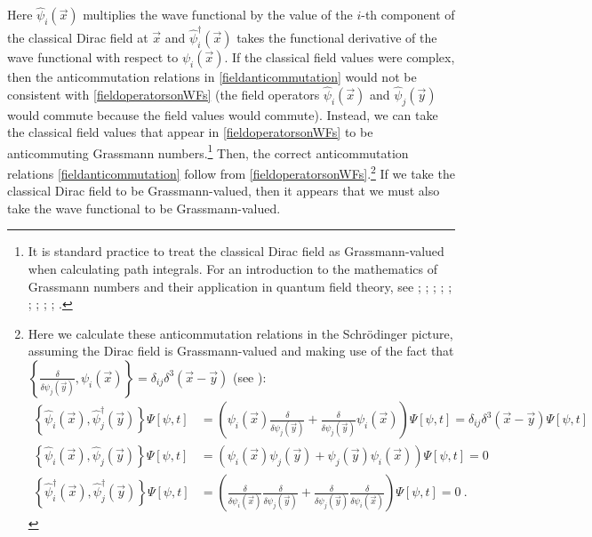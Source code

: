 \documentclass[onecolumn,secnumarabic,amsmath,amssymb,balancelastpage,nofootinbib]{article}
\begin{document}
Here $\widehat{\psi}_i(\vec{x})$ multiplies the wave functional by the value of the $i$-th component of the classical Dirac field at $\vec{x}$ and $\widehat{\psi}_i^{\dagger}(\vec{x})$ takes the functional derivative of the wave functional with respect to $\psi_i(\vec{x})$.  If the classical field values were complex, then the anticommutation relations in \eqref{fieldanticommutation} would not be consistent with \eqref{fieldoperatorsonWFs} (the field operators $\widehat{\psi}_i(\vec{x})$ and $\widehat{\psi}_j(\vec{y})$ would commute because the field values would commute).  Instead, we can take the classical field values that appear in \eqref{fieldoperatorsonWFs} to be anticommuting Grassmann numbers.\footnote{It is standard practice to treat the classical Dirac field as Grassmann-valued when calculating path integrals.  For an introduction to the mathematics of Grassmann numbers and their application in quantum field theory, see \citet{berezin}; \citet{hatfield}; \citet[ch.\ 4]{valentini1992}; \citet{valentini1996}; \citet[sec.\ 9.5]{peskinschroeder}; \citet[sec.\ 6.7]{ryder}; \citet[sec.\ 12.8]{greiner1996}; \citet[sec.\ 11.5]{zee2010}; \citet[sec.\ 10.3.2]{duncan}; \citet[sec.\ 14.6]{schwartz}.}  Then, the correct anticommutation relations \eqref{fieldanticommutation} follow from \eqref{fieldoperatorsonWFs}.\footnote{Here we calculate these anticommutation relations in the Schr\"{o}dinger picture, assuming the Dirac field is Grassmann-valued and making use of the fact that $\left\{\frac{\delta}{\delta \psi_j(\vec{y})},\psi_i(\vec{x})\right\}=\delta_{ij}\delta^3 (\vec{x}-\vec{y})$ (see \citealp[eq.\ 9.63]{hatfield}):
\begin{align}
\left\{\widehat{\psi}_i(\vec{x}),\widehat{\psi}^{\dagger}_j(\vec{y})\right\}\Psi[\psi,t]&=\left(\psi_i(\vec{x})\frac{\delta}{\delta \psi_j(\vec{y})}+\frac{\delta}{\delta \psi_j(\vec{y})}\psi_i(\vec{x})\right)\Psi[\psi,t]=\delta_{ij}\delta^3 (\vec{x}-\vec{y})\Psi[\psi,t]
\nonumber
\\
\left\{\widehat{\psi}_i(\vec{x}),\widehat{\psi}_j(\vec{y})\right\}\Psi[\psi,t]&=\left(\psi_i(\vec{x})\psi_j(\vec{y})+\psi_j(\vec{y})\psi_i(\vec{x})\right)\Psi[\psi,t]=0
\nonumber
\\
\left\{\widehat{\psi}^{\dagger}_i(\vec{x}),\widehat{\psi}^{\dagger}_j(\vec{y})\right\}\Psi[\psi,t]&=\left(\frac{\delta}{\delta \psi_i(\vec{x})}\frac{\delta}{\delta \psi_j(\vec{y})}+\frac{\delta}{\delta \psi_j(\vec{y})}\frac{\delta}{\delta \psi_i(\vec{x})}\right)\Psi[\psi,t]=0
\label{derivingfieldcommutation}
\ .
\end{align}
}  If we take the classical Dirac field to be Grassmann-valued, then it appears that we must also take the wave functional to be Grassmann-valued.
\end{document}
